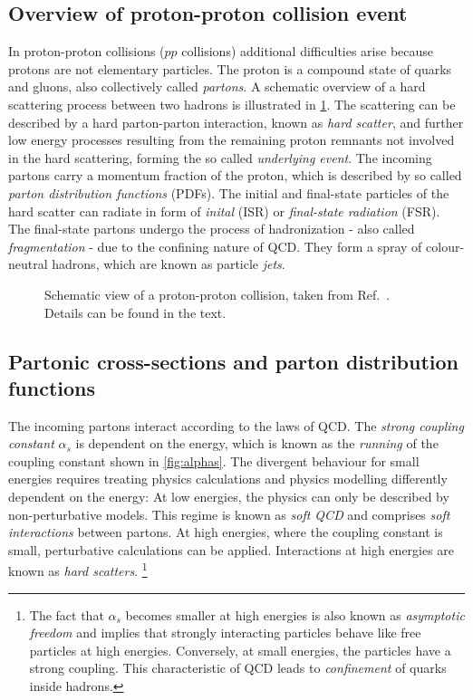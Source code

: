 \subsection{Overview of proton-proton collision event}
In proton-proton collisions ($pp$ collisions) additional difficulties arise because protons are not elementary particles. The proton is a compound state of quarks and gluons, also collectively called \emph{partons}.
A schematic overview of a hard scattering process between two hadrons is illustrated in \cref{fig:ppcol}.
The scattering can be described by a hard parton-parton interaction, known as \emph{hard scatter}, and further low energy processes resulting from the remaining proton remnants not involved in the hard scattering, forming the so called \emph{underlying event}.
The incoming partons carry a momentum fraction of the proton, which is described by so called \emph{parton distribution functions} (PDFs).
The initial and final-state particles of the hard scatter can radiate in form of \emph{inital} (ISR) or \emph{final-state radiation} (FSR). The final-state partons undergo the process of hadronization - also called \emph{fragmentation} - due to the confining nature of QCD.
They form a spray of colour-neutral hadrons, which are known as particle \emph{jets}.

\begin{figure}
  \caption[Schematic view of a proton-proton collision.]{Schematic view of a proton-proton collision, taken from Ref.~\cite{Bhatti:2010bf}. Details can be found in the text.}
  \label{fig:ppcol}
\end{figure}

\subsection{Partonic cross-sections and parton distribution functions}
The incoming partons interact according to the laws of QCD.
The \emph{strong coupling constant} $\alpha_s$ is dependent on the energy, which is known as the \emph{running} of the coupling constant shown in \cref{fig:alphas}.
The divergent behaviour for small energies requires treating physics calculations and physics modelling differently dependent on the energy:
At low energies, the physics can only be described by non-perturbative models. This regime is known as \emph{soft QCD} and comprises \emph{soft interactions} between partons.
At high energies, where the coupling constant is small, perturbative calculations can be applied. Interactions at high energies are known as \emph{hard scatters}. \footnote{The fact that $\alpha_s$ becomes smaller at high energies is also known as \emph{asymptotic freedom} and implies that strongly interacting particles behave like free particles at high energies. Conversely, at small energies, the particles have a strong coupling. This characteristic of QCD leads to \emph{confinement} of quarks inside hadrons.}

